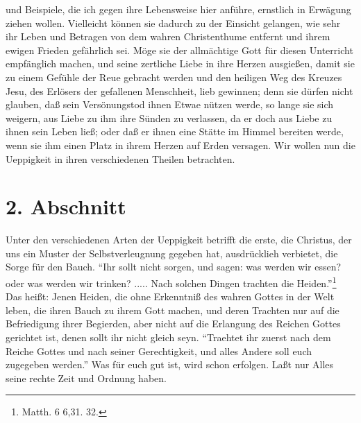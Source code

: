 und Beispiele, die ich gegen ihre Lebensweise hier anführe, ernstlich in
Erwägung ziehen wollen. Vielleicht können sie dadurch zu der Einsicht gelangen,
wie sehr ihr Leben und Betragen von dem wahren Christenthume entfernt und ihrem
ewigen Frieden gefährlich sei. Möge sie der allmächtige Gott für diesen
Unterricht empfänglich machen, und seine zertliche Liebe in ihre Herzen
ausgießen, damit sie zu einem Gefühle der Reue gebracht werden und den heiligen
Weg des Kreuzes Jesu, des Erlösers der gefallenen Menschheit, lieb gewinnen;
denn sie dürfen nicht glauben, daß sein Versönungstod ihnen Etwae nützen werde,
so lange sie sich weigern, aus Liebe zu ihm ihre Sünden zu verlassen, da er doch
aus Liebe zu ihnen sein Leben ließ; oder daß er ihnen eine Stätte im Himmel
bereiten werde, wenn sie ihm einen Platz in ihrem Herzen auf Erden versagen. Wir
wollen nun die Ueppigkeit in ihren verschiedenen Theilen betrachten.

\section{2. Abschnitt} \label{kap14_ab2}

Unter den verschiedenen Arten der Ueppigkeit betrifft die erste, die Christus,
der uns ein Muster der Selbstverleugnung gegeben hat, ausdrücklieh verbietet,
die Sorge für den Bauch. "`Ihr sollt nicht sorgen, und sagen: was werden wir
essen? oder was werden wir trinken? ..... Nach solchen Dingen trachten die
Heiden."'\footnote{Matth. 6 6,31. 32.} Das heißt: Jenen Heiden, die ohne
Erkenntniß des wahren Gottes in der Welt leben, die ihren Bauch zu ihrem Gott
machen, und deren Trachten nur auf die Befriedigung ihrer Begierden, aber nicht
auf die Erlangung des Reichen Gottes gerichtet ist, denen sollt ihr nicht gleich
seyn. "`Traehtet ihr zuerst nach dem Reiche Gottes und nach seiner
Gerechtigkeit, und alles Andere soll euch zugegeben werden."' Was für euch gut
ist, wird schon erfolgen. Laßt nur Alles seine rechte Zeit und Ordnung haben.

\medskip

